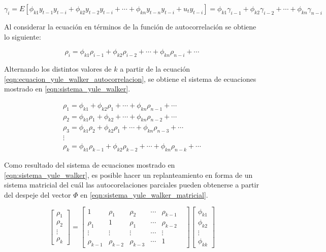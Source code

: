 \documentclass[
]{article}
\begin{document}
\begin{equation}
\label{eqn:ecuacion_yule_walker_general}
\gamma_i=E\left[ \phi_{k1}y_{t-1}y_{t-i} + \phi_{k2}y_{t-2}y_{t-i} + \cdots + \phi_{kn}y_{t-n}y_{t-i} + u_ty_{t-i} \right]=\phi_{k1}\gamma_{i-1} + \phi_{k2}\gamma_{i-2} + \cdots + \phi_{kn}\gamma_{n-i}
\end{equation}

Al considerar la ecuación en términos de la función de autocorrelación
se obtiene lo siguiente:

\begin{equation}
\label{eqn:ecuacion_yule_walker_autocorrelacion}
\rho_i=\phi_{k1}\rho_{i-1} + \phi_{k2}\rho_{i-2} + \cdots + \phi_{kn}\rho_{n-i}+\cdots
\end{equation}

Alternando los distintos valores de \(k\) a partir de la ecuación
\ref{eqn:ecuacion_yule_walker_autocorrelacion}, se obtiene el sistema de
ecuaciones mostrado en \ref{eqn:sistema_yule_walker}.

\begin{equation}
\label{eqn:sistema_yule_walker}
\begin{array}{lll} 
\rho_1=\phi_{k1} + \phi_{k2}\rho_{1} + \cdots + \phi_{kn}\rho_{n-1}+\cdots \\
\rho_2=\phi_{k1}\rho_{1} + \phi_{k2} + \cdots + \phi_{kn}\rho_{n-2}+\cdots \\
\rho_3=\phi_{k1}\rho_{2} + \phi_{k2}\rho_{1} + \cdots + \phi_{kn}\rho_{n-3}+\cdots \\
\vdots \\
\rho_k=\phi_{k1}\rho_{k-1} + \phi_{k2}\rho_{k-2} + \cdots + \phi_{kn}\rho_{n-k}+\cdots
\end{array}
\end{equation}

Como resultado del sistema de ecuaciones mostrado en
\ref{eqn:sistema_yule_walker}, es posible hacer un replanteamiento en
forma de un sistema matricial del cuál las autocorelaciones parciales
pueden obtenerse a partir del despeje del vector \(\Phi\) en
\ref{eqn:sistema_yule_walker_matricial}.

\begin{equation}
\label{eqn:sistema_yule_walker_matricial}
\left[ \begin{array}{c} \rho_1 \\ \rho_2 \\ \vdots \\ \rho_k \end{array} \right] = \begin{bmatrix} 1 & \rho_1 & \rho_2 & \cdots & \rho_{k-1} \\ \rho_1 & 1 & \rho_1 & \cdots & \rho_{k-2} \\ \vdots & \vdots & \vdots & \cdots & \vdots \\ \rho_{k-1} & \rho_{k-2} & \rho_{k-3} & \cdots & 1 &\end{bmatrix} \left[ \begin{array}{c} \phi_{k1} \\ \phi_{k2}  \\ \vdots \\ \phi_{kk} \end{array} \right]\end{equation}
\end{document}
